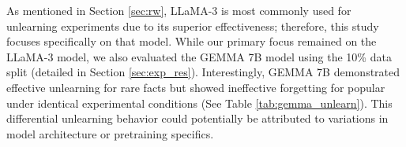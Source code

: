 \documentclass[sigconf,anonymous]{aamas}
\begin{document}
As mentioned in Section \ref{sec:rw}, LLaMA-3 is most commonly used for unlearning experiments due to its superior effectiveness; therefore, this study focuses specifically on that model. While our primary focus remained on the LLaMA-3 model, we also evaluated the GEMMA 7B model using the 10\% data split (detailed in Section \ref{sec:exp_res}). Interestingly, GEMMA 7B demonstrated effective unlearning for rare facts but showed ineffective forgetting for popular under identical experimental conditions (See Table \ref{tab:gemma_unlearn}). This differential unlearning behavior could potentially be attributed to variations in model architecture or pretraining specifics.


\begin{table}[h!t]
  \caption{ROUGE-L recall performance on Gemma 7B for 10\% forget-set size. Top: rare unlearning splits; Bottom: popular unlearning splits.}
  \label{tab:gemma_unlearn}
  \centering
  \small
  \setlength{\tabcolsep}{3pt}
\end{table}
\end{document}
